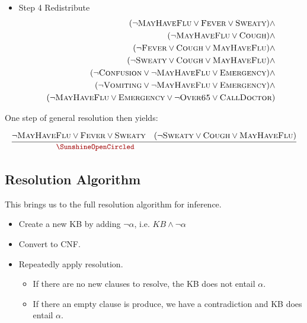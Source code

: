 \documentclass[11pt]{article}
\begin{document}
\begin{itemize}
\item Step 4 Redistribute
\begin{eqnarray*}
 ( \lnot \mathrm{\textsc{MayHaveFlu}} \lor \mathrm{\textsc{Fever}} \lor \mathrm{\textsc{Sweaty}}) \land \\
 (\lnot \mathrm{\textsc{MayHaveFlu}} \lor \mathrm{\textsc{Cough}})  \land \\
(\lnot \mathrm{\textsc{Fever}} \lor \mathrm{\textsc{Cough}} \lor \mathrm{\textsc{MayHaveFlu}}) \land \\ 
(\lnot \mathrm{\textsc{Sweaty}} \lor \mathrm{\textsc{Cough}} \lor \mathrm{\textsc{MayHaveFlu}}) \land \\ 
(\lnot \mathrm{\textsc{Confusion}} \lor \lnot \mathrm{\textsc{MayHaveFlu}} \lor \mathrm{\textsc{Emergency}}) \land \\
(\lnot \mathrm{\textsc{Vomiting}} \lor \lnot \mathrm{\textsc{MayHaveFlu}} \lor \mathrm{\textsc{Emergency}}) \land \\
  (\lnot \mathrm{\textsc{MayHaveFlu}} \lor  \mathrm{\textsc{Emergency}} \lor \lnot \mathrm{\textsc{Over65}} \lor \mathrm{\textsc{CallDoctor}})\\
\end{eqnarray*}
\end{itemize}


\noindent One step  of general resolution then yields:
\air

\[
  \infer{\censorm{\msc{Fever} \lor \msc{Sweaty}\lor \lnot \msc{Sweaty} \lor
    \msc{Cough} \lor \msc{MayHaveFlu}}}{ \lnot \msc{MayHaveFlu} \lor
    \msc{Fever} \lor \msc{Sweaty} & (\lnot \msc{Sweaty} \lor
    \msc{Cough} \lor \msc{MayHaveFlu}) }
\]


\subsection{Resolution Algorithm}

This brings us to the full resolution algorithm for inference. 

\begin{itemize}
\item Create a new KB by adding $\lnot \alpha$, i.e. $KB \land \lnot \alpha$
\item Convert to CNF.
\item Repeatedly apply resolution.
  \begin{itemize}
  \item If there are no new clauses to resolve, the 
    KB does not entail $\alpha$.
  \item If there an empty clause is produce, we have a contradiction and KB does entail $\alpha$.
  \end{itemize}

\end{itemize}
\end{document}
